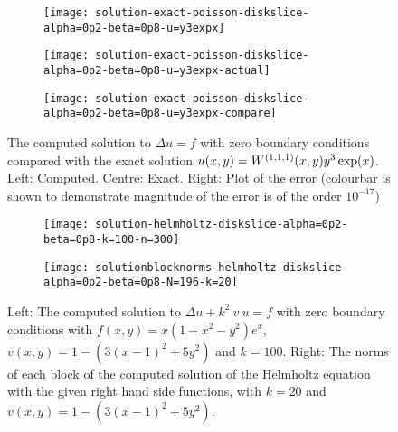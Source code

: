 \begin{figure}[t]
	\begin{subfigure}{0.3\textwidth}
	\texttt{[image: solution-exact-poisson-diskslice-alpha=0p2-beta=0p8-u=y3expx]}
	\centering
	\end{subfigure}
	\begin{subfigure}{0.3\textwidth}
	\centering
	\texttt{[image: solution-exact-poisson-diskslice-alpha=0p2-beta=0p8-u=y3expx-actual]}
	\centering
	\end{subfigure}
	\begin{subfigure}{0.3\textwidth}
	\texttt{[image: solution-exact-poisson-diskslice-alpha=0p2-beta=0p8-u=y3expx-compare]}
	\centering
	\end{subfigure}
	\centering
	\caption{The computed solution to $\Delta u = f$ with zero boundary conditions compared with the exact solution $u(x,y) = W^{(1,1,1)} (x,y) y^3 \exp(x)$. Left: Computed. Centre: Exact. Right: Plot of the error (colourbar is shown to demonstrate magnitude of the error is of the order $10^{-17}$)}
	\centering
	\label{fig:ds:poissonexact}
\end{figure}

\begin{figure}[t]
	\begin{subfigure}{0.3\textwidth}
	\centering
	\texttt{[image: solution-helmholtz-diskslice-alpha=0p2-beta=0p8-k=100-n=300]}
	\end{subfigure}
	\begin{subfigure}{0.5\textwidth}
	\texttt{[image: solutionblocknorms-helmholtz-diskslice-alpha=0p2-beta=0p8-N=196-k=20]}
	\centering
	\end{subfigure}
	\caption{Left: The computed solution to $\Delta u + k^2 \: v \: u = f$ with zero boundary conditions with $f(x,y) = x(1-x^2-y^2)e^x$, $v(x,y) = 1 - (3(x-1)^2 + 5y^2)$ and $k = 100$. Right: The norms of each block of the computed solution of the Helmholtz equation with the given right hand side functions, with $k=20$ and $v(x,y) = 1 - (3(x-1)^2 + 5y^2)$.}
	\centering
	\label{fig:ds:helmholtz}
\end{figure}

